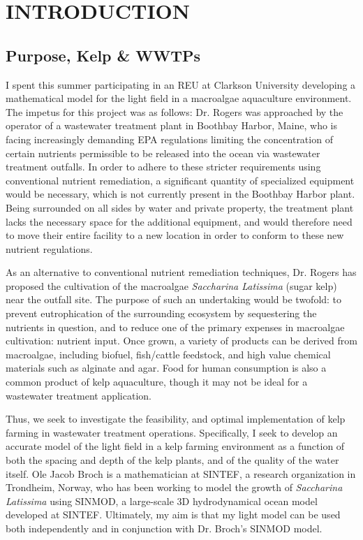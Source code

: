 \chapter{INTRODUCTION} \label{ch:intro}

\section{Purpose, Kelp \& WWTPs}
I spent this summer participating in an REU at Clarkson University developing a mathematical model for the light field in a macroalgae aquaculture environment. The impetus for this project was as follows: Dr. Rogers was approached by the operator of a wastewater treatment plant in Boothbay Harbor, Maine, who is facing increasingly demanding EPA regulations limiting the concentration of certain nutrients permissible to be released into the ocean via wastewater treatment outfalls.
In order to adhere to these stricter requirements using conventional nutrient remediation, a significant quantity of specialized equipment would be necessary, which is not currently present in the Boothbay Harbor plant.
Being surrounded on all sides by water and private property, the treatment plant lacks the necessary space for the additional equipment, and would therefore need to move their entire facility to a new location in order to conform to these new nutrient regulations.

As an alternative to conventional nutrient remediation techniques, Dr. Rogers has proposed the cultivation of the macroalgae \textit{Saccharina Latissima} (sugar kelp) near the outfall site.
The purpose of such an undertaking would be twofold: to prevent eutrophication of the surrounding ecosystem by sequestering the nutrients in question, and to reduce one of the primary expenses in macroalgae cultivation: nutrient input.
Once grown, a variety of products can be derived from macroalgae, including biofuel, fish/cattle feedstock, and high value chemical materials such as alginate and agar.
Food for human consumption is also a common product of kelp aquaculture, though it may not be ideal for a wastewater treatment application.

Thus, we seek to investigate the feasibility, and optimal implementation of kelp farming in wastewater treatment operations. 
Specifically, I seek to develop an accurate model of the light field in a kelp farming environment as a function of both the spacing and depth of the kelp plants, and of the quality of the water itself.
Ole Jacob Broch is a mathematician at SINTEF, a research organization in Trondheim, Norway, who has been working to model the growth of \textit{Saccharina Latissima} using SINMOD, a large-scale 3D hydrodynamical ocean model developed at SINTEF.
Ultimately, my aim is that my light model can be used both independently and in conjunction with Dr. Broch's SINMOD model.

